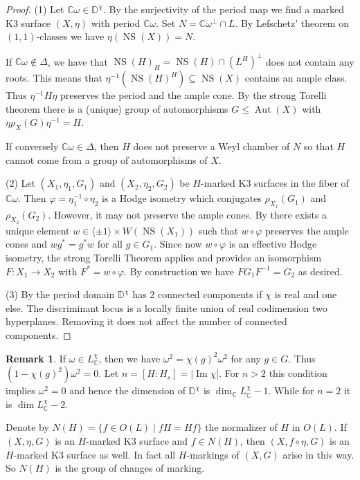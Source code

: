 \documentclass[a4paper]{amsart}
\theoremstyle{definition}
\newtheorem{remark}[definition]{Remark}
\theoremstyle{plain}
\DeclareMathOperator{\NS}{NS}
\DeclareMathOperator{\Aut}{Aut}
\DeclareMathOperator{\image}{Im}
\newcommand{\CC}{\mathbb{C}}
\newcommand{\DD}{\mathbb{D}}
\begin{document}
\begin{proof}
(1) Let $\CC \omega \in \DD^\chi$.
By the surjectivity of the period map we find a marked K3 surface $(X,\eta)$ with period $\CC \omega$.
Set $N = \CC \omega^\perp \cap L$. By Lefschetz' theorem on $(1,1)$-classes we have $\eta(\NS(X))=N$.

  If $\CC\omega \not \in \Delta$, we have that $\NS(H)_H = \NS(H) \cap (L^H)^\perp$ does not contain any roots. This means that $\eta^{-1}(\NS(H)^H)\subseteq \NS(X)$ contains an ample class.
Thus $\eta^{-1} H \eta$ preserves the period and the ample cone. By the strong Torelli theorem there is a (unique) group of automorphisms $G\leq \Aut(X)$ with
$\eta \rho_X(G) \eta^{-1}=H$.

If conversely $\CC \omega \in \Delta$, then $H$ does not preserve a Weyl chamber of $N$ so that $H$ cannot come from a group of automorphisms of $X$.

(2) Let $(X_1,\eta_1,G_1)$ and $(X_2,\eta_2,G_2)$ be $H$-marked K3 surfaces in the fiber of $\CC \omega$.
Then $\varphi = \eta_1^{-1} \circ \eta_2$ is a Hodge isometry which conjugates $\rho_{X_1}(G_1)$ and $\rho_{X_2}(G_2)$. However, it may not preserve the ample cones. By \cite[Lemma 1.7 and Theorem 1.8]{oguiso-sakurai} there exists a unique element $w \in \langle \pm 1\rangle \times W(\NS(X_1))$
such that $w \circ \varphi$ preserves the ample cones and $w g^*= g^* w$ for all $g \in G_1$. Since now $w \circ \varphi$ is an effective Hodge isometry, the strong Torelli Theorem applies and provides an isomorphism $F\colon X_1 \to X_2$ with $F^*=w \circ \varphi$.
By construction we have $FG_1 F^{-1} = G_2$ as desired.

  (3) By \cite[\S9 \& \S 11]{dolgachev-kondo2005} the period domain $\DD^\chi$ has $2$ connected components if $\chi$ is real and one else. The discriminant locus is a locally finite union of real codimension two hyperplanes. Removing it does not affect the number of connected components.
\end{proof}


\begin{remark}
If $\omega \in L_\CC^\chi$, then we have $\omega^2 = \chi(g)^2 \omega^2$ for any $g \in G$. Thus $(1-\chi(g)^2)\omega^2=0$.
Let $n = [H:H_s]=\lvert \image \chi \rvert$. For $n>2$ this condition implies $\omega^2=0$ and hence the dimension of $\DD^\chi$ is $\dim_\CC L^\chi_\CC -1$.
While for $n=2$ it is $\dim L^\chi_\CC -2$.
\end{remark}

Denote by $N(H)=\{f \in O(L) \mid f H = H f\}$ the normalizer of $H$ in $O(L)$.
If $(X,\eta,G)$ is an $H$-marked K3 surface and $f \in N(H)$, then $(X,f \circ \eta, G)$ is an $H$-marked K3 surface as well. In fact all $H$-markings of $(X,G)$ arise in this way.
So $N(H)$ is the group of changes of marking.
\end{document}
